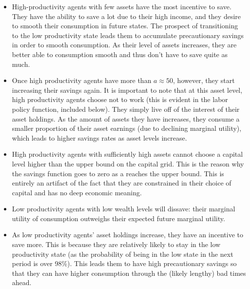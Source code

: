 \documentclass[12pt]{article}
\begin{document}
\begin{itemize}
 \item High-productivity agents with few assets have the most incentive to save. They have the ability to save a lot due to their high income, and they desire to smooth their consumption in future states. The prospect of transitioning to the low productivity state leads them to accumulate precautionary savings in order to smooth consumption. As their level of assets increases, they are better able to consumption smooth and thus don't have to save quite as much. 
 \item Once high productivity agents have more than $a \approx 50$, however, they start increasing their savings again. It is important to note that at this asset level, high productivity agents choose not to work (this is evident in the labor policy function, included below). They simply live off of the interest of their asset holdings. As the amount of assets they have increases, they consume a smaller proportion of their asset earnings (due to declining marginal utility), which leads to higher savings rates as asset levels increase.
 \item High productivity agents with sufficiently high assets cannot choose a capital level higher than the upper bound on the capital grid. This is the reason why the savings function goes to zero as a reaches the upper bound. This is entirely an artifact of the fact that they are constrained in their choice of capital and has no deep economic meaning.
 \item Low productivity agents with low wealth levels will dissave: their marginal utility of consumption outweighs their expected future marginal utility.
 \item As low productivity agents' asset holdings increase, they have an incentive to save more. This is because they are relatively likely to stay in the low productivity state (as the probability of being in the low state in the next period is over 98\%). This leads them to have high precautionary savings so that they can have higher consumption through the (likely lengthy) bad times ahead. 
\end{itemize}
\end{document}
